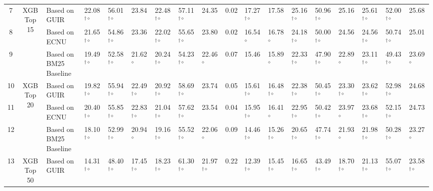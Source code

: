 \begin{table*}
{\begin{tabular}{ccllllllllllllllll}
\midrule
7 & \multirow{3}{*}{XGB Top 15} & Based on GUIR  & 22.08$^{\dagger\diamond}$ & 56.01$^{\dagger\diamond}$ & 23.84  & 22.48$^{\dagger\diamond}$ & 57.11$^{\dagger\diamond}$ & 24.35 & 0.02 & 17.27$^{\dagger\diamond}$ & 17.58 & 25.16$^{\dagger\diamond}$ & 50.96$^{\dagger\diamond}$ & 25.16 & 25.61$^{\dagger\diamond}$ & 52.00$^{\dagger\diamond}$ & 25.68\tabularnewline
8  &  & Based on ECNU  & 21.65$^{\dagger\diamond}$ & 54.86$^{\dagger\diamond}$ & 23.36  & 22.02$^{\dagger\diamond}$ & 55.65$^{\dagger\diamond}$ & 23.80 & 0.02 & 16.54 $^{\diamond}$  & 16.78$^{\diamond}$  & 24.18$^{\dagger\diamond}$ & 50.00$^{\dagger\diamond}$ & 24.56 & 24.56$^{\dagger\diamond}$ & 50.74$^{\dagger\diamond}$ & 25.01\tabularnewline
9  &  & Based on BM25 Baseline  & 19.49$^{\dagger\diamond}$ & 52.58$^{\dagger\diamond}$ & 21.62$^{\diamond}$  & 20.24$^{\dagger\diamond}$ & 54.23$^{\dagger\diamond}$ & 22.46$^{\diamond}$ & 0.07 & 15.46  & 15.89$^{\diamond}$  & 22.33$^{\dagger\diamond}$ & 47.90$^{\dagger\diamond}$ & 22.89$^{\diamond}$ & 23.11$^{\dagger\diamond}$ & 49.43$^{\dagger\diamond}$ & 23.69$^{\diamond}$\tabularnewline
\midrule 
10 & \multirow{3}{*}{XGB Top 20} & Based on GUIR  & 19.82$^{\dagger\diamond}$ & 55.94$^{\dagger\diamond}$ & 22.49$^{\dagger\diamond}$ & 20.92$^{\dagger\diamond}$ & 58.69$^{\dagger\diamond}$ & 23.74 & 0.05 & 15.61$^{\dagger\diamond}$ & 16.48$^{\dagger\diamond}$ & 22.38$^{\dagger\diamond}$ & 50.45$^{\dagger\diamond}$ & 23.30$^{\dagger\diamond}$ & 23.62$^{\dagger\diamond}$ & 52.98$^{\dagger\diamond}$ & 24.68\tabularnewline
11 &  & Based on ECNU  & 20.40$^{\dagger\diamond}$ & 55.85$^{\dagger\diamond}$ & 22.83$^{\dagger\diamond}$ & 21.04$^{\dagger\diamond}$ & 57.62$^{\dagger\diamond}$ & 23.54 & 0.04 & 15.95$^{\dagger\diamond}$ & 16.41$^{\diamond}$  & 22.95$^{\dagger\diamond}$ & 50.42$^{\dagger\diamond}$ & 23.97$^{\diamond}$ & 23.68$^{\dagger\diamond}$ & 52.15$^{\dagger\diamond}$ & 24.73\tabularnewline
12  &  & Based on BM25 Baseline  & 18.10$^{\dagger\diamond}$ & 52.99$^{\dagger\diamond}$ & 20.94$^{\diamond}$ & 19.16$^{\dagger\diamond}$ & 55.52$^{\dagger\diamond}$ & 22.06$^{\diamond}$ & 0.09 & 14.46$^{\dagger\diamond}$ & 15.26$^{\dagger\diamond}$ & 20.65$^{\dagger\diamond}$ & 47.74$^{\dagger\diamond}$ & 21.93$^{\diamond}$ & 21.98$^{\dagger\diamond}$ & 50.28$^{\dagger\diamond}$ & 23.27$^{\diamond}$\tabularnewline
\midrule 
13 & \multirow{3}{*}{XGB Top 50} & Based on GUIR  & 14.31$^{\dagger\diamond}$ & 48.40$^{\dagger\diamond}$ & 17.45$^{\dagger\diamond}$ & 18.23$^{\dagger\diamond}$ & 61.30$^{\dagger\diamond}$ & 21.97$^{\dagger\diamond}$ & 0.22 & 12.39$^{\dagger\diamond}$ & 15.45$^{\dagger\diamond}$ & 16.65$^{\dagger\diamond}$ & 43.49$^{\dagger\diamond}$ & 18.70$^{\dagger\diamond}$ & 21.13$^{\dagger\diamond}$ & 55.07$^{\dagger\diamond}$ & 23.58$^{\dagger\diamond}$\tabularnewline

\end{tabular}}
\end{table*}
